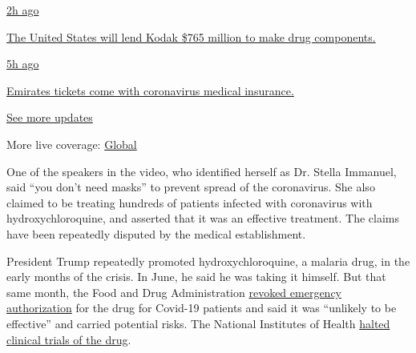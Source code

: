 \href{https://web.archive.org/web/20200728210031/https://www.nytimes.com/live/2020/07/28/business/stock-market-today-coronavirus?action=click\&pgtype=Article\&state=default®ion=MAIN_CONTENT_1\&context=storylines_live_updates\#the-united-states-will-lend-kodak-765-million-to-make-drug-components}{2h
ago}

\href{https://web.archive.org/web/20200728210031/https://www.nytimes.com/live/2020/07/28/business/stock-market-today-coronavirus?action=click\&pgtype=Article\&state=default®ion=MAIN_CONTENT_1\&context=storylines_live_updates\#the-united-states-will-lend-kodak-765-million-to-make-drug-components}{The
United States will lend Kodak \$765 million to make drug components.}

\href{https://web.archive.org/web/20200728210031/https://www.nytimes.com/live/2020/07/28/business/stock-market-today-coronavirus?action=click\&pgtype=Article\&state=default®ion=MAIN_CONTENT_1\&context=storylines_live_updates\#emirates-tickets-come-with-coronavirus-medical-insurance}{5h
ago}

\href{https://web.archive.org/web/20200728210031/https://www.nytimes.com/live/2020/07/28/business/stock-market-today-coronavirus?action=click\&pgtype=Article\&state=default®ion=MAIN_CONTENT_1\&context=storylines_live_updates\#emirates-tickets-come-with-coronavirus-medical-insurance}{Emirates
tickets come with coronavirus medical insurance.}

\href{https://web.archive.org/web/20200728210031/https://www.nytimes.com/live/2020/07/28/business/stock-market-today-coronavirus?action=click\&pgtype=Article\&state=default®ion=MAIN_CONTENT_1\&context=storylines_live_updates}{See
more updates}

More live coverage:
\href{https://web.archive.org/web/20200728210031/https://www.nytimes.com/2020/07/28/world/coronavirus-covid-19.html?action=click\&pgtype=Article\&state=default®ion=MAIN_CONTENT_1\&context=storylines_live_updates}{Global}

One of the speakers in the video, who identified herself as Dr. Stella
Immanuel, said ``you don't need masks'' to prevent spread of the
coronavirus. She also claimed to be treating hundreds of patients
infected with coronavirus with hydroxychloroquine, and asserted that it
was an effective treatment. The claims have been repeatedly disputed by
the medical establishment.

President Trump repeatedly promoted hydroxychloroquine, a malaria drug,
in the early months of the crisis. In June, he said he was taking it
himself. But that same month, the Food and Drug Administration
\href{https://web.archive.org/web/20200728210031/https://www.fda.gov/media/138945/download}{revoked
emergency authorization} for the drug for Covid-19 patients and said it
was ``unlikely to be effective'' and carried potential risks. The
National Institutes of Health
\href{https://web.archive.org/web/20200728210031/https://www.nytimes.com/2020/06/20/health/hydroxychloroquine-coronavirus-trial.html}{halted
clinical trials of the drug}.

